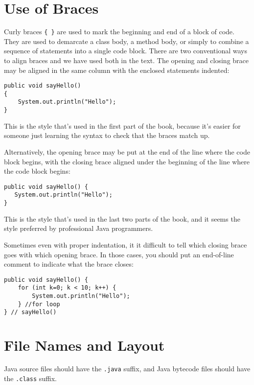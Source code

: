 \section*{Use of Braces}
\noindent Curly braces \verb|{ }| are used to mark the beginning and end of a
block of code.  They are used to demarcate a class body, a method body,
or simply to combine a sequence of statements into a single code
block.  There are two conventional ways to align braces and we have
used both in the text.  The opening and closing brace may be aligned in
the same column with the enclosed statements indented:

\begin{jjjlisting}
\begin{lstlisting}
public void sayHello()
{
    System.out.println("Hello");
}
\end{lstlisting}
\end{jjjlisting}

\noindent This is the style that's used in the first part of the
book, because it's easier for someone just learning the syntax
to check that the braces match up.

Alternatively, the opening brace may be put at the end of the line
where the code block begins, with the closing brace aligned under the
beginning of the line where the code block begins:

\begin{jjjlisting}
\begin{lstlisting}
public void sayHello() {
   System.out.println("Hello");
}
\end{lstlisting}
\end{jjjlisting}

\noindent This is the style that's used in the last two parts of the
book, and it seems the style preferred by professional Java programmers.

Sometimes even with proper indentation, it it difficult
to tell which closing brace goes with which opening brace.  In those
cases, you should put an end-of-line comment to indicate what the brace
closes:

\begin{jjjlisting}
\begin{lstlisting}
public void sayHello() {
    for (int k=0; k < 10; k++) {
        System.out.println("Hello");
    } //for loop
} // sayHello()
\end{lstlisting}
\end{jjjlisting}

\section*{File Names and Layout}
\noindent Java source files should have the {\tt .java} suffix, and Java
bytecode files should have the {\tt .class} suffix.

